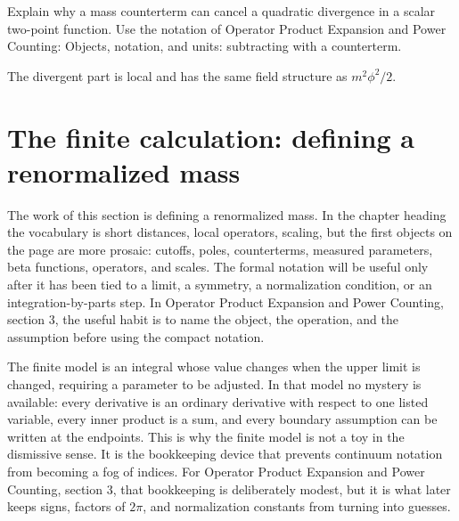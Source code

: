\begin{exercise}
Explain why a mass counterterm can cancel a quadratic divergence in a scalar two-point function.  Use the notation of Operator Product Expansion and Power Counting: Objects, notation, and units: subtracting with a counterterm.
\begin{answer}
The divergent part is local and has the same field structure as \(m^2\phi^2/2\).
\end{answer}
\end{exercise}



\section{The finite calculation: defining a renormalized mass}













The work of this section is defining a renormalized mass.  In the chapter heading the vocabulary is short distances, local operators, scaling, but the first objects on the page are more prosaic: cutoffs, poles, counterterms, measured parameters, beta functions, operators, and scales.  The formal notation will be useful only after it has been tied to a limit, a symmetry, a normalization condition, or an integration-by-parts step.  In Operator Product Expansion and Power Counting, section 3, the useful habit is to name the object, the operation, and the assumption before using the compact notation.

The finite model is an integral whose value changes when the upper limit is changed, requiring a parameter to be adjusted.  In that model no mystery is available: every derivative is an ordinary derivative with respect to one listed variable, every inner product is a sum, and every boundary assumption can be written at the endpoints.  This is why the finite model is not a toy in the dismissive sense.  It is the bookkeeping device that prevents continuum notation from becoming a fog of indices.  For Operator Product Expansion and Power Counting, section 3, that bookkeeping is deliberately modest, but it is what later keeps signs, factors of \(2\pi\), and normalization constants from turning into guesses.

